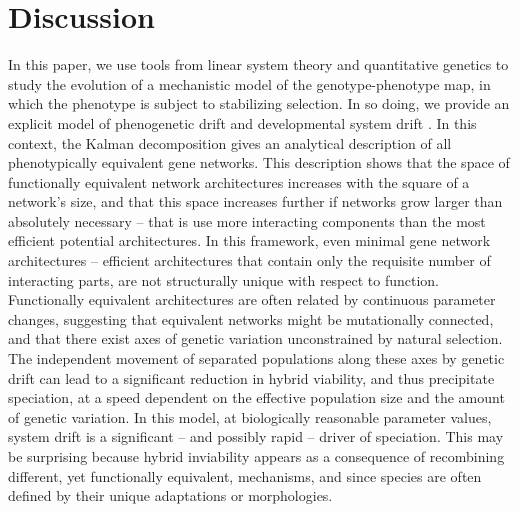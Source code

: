 \documentclass{article}
\newcommand{\1}{\mathbbm{1}}
\begin{document}
\section*{Discussion}


In this paper, we use tools from linear system theory and quantitative genetics
to study the evolution of a mechanistic model of the genotype-phenotype map, 
in which the phenotype is subject to stabilizing selection.
In so doing, we provide an explicit model of
phenogenetic drift \citep{weiss2000phenogenetic} and developmental system drift \citep{true2001developmental}.
In this context, the Kalman decomposition \citep{kalman1963mathematical}
gives an analytical description of all phenotypically equivalent gene networks.
This description shows that the space of functionally equivalent network architectures increases with the square of a network's size,
and that this space increases further if networks grow larger than absolutely necessary -- that is use more interacting components than the most efficient potential architectures.
In this framework, even minimal gene network architectures -- efficient architectures that contain only the requisite number of interacting parts,
are not structurally unique with respect to function.
Functionally equivalent architectures are often related by continuous parameter changes, suggesting that equivalent networks might be mutationally connected, 
and that there exist axes of genetic variation unconstrained by natural selection.
The independent movement of separated populations along these axes by genetic drift
can lead to a significant reduction in hybrid viability, and thus precipitate speciation,
at a speed dependent on the effective population size and the amount of genetic variation. 
In this model, at biologically reasonable parameter values,
system drift is a significant -- and possibly rapid -- driver of speciation.
This may be surprising because
hybrid inviability appears as a consequence of recombining different, yet functionally equivalent, mechanisms, and since species are often defined by their unique adaptations or morphologies. 
\end{document}
